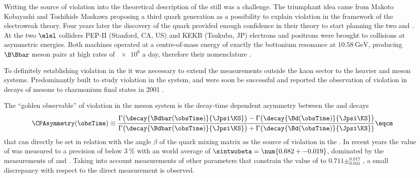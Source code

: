Writing the source of \CP violation into the theoretical description of the  \SM
still was a challenge. The triumphant idea came from Makoto Kobayashi and
Toshihide Maskawa \cite{Kobayashi:1973fv} proposing a third quark generation as
a possibility to explain \CP violation in the framework of the electroweak
theory. Four years later the discovery of the \bquark quark \cite{Herb:1977ek}
provided enough confidence in their theory to start planning the two \BFactories
\Babar and \Belle. At the two $\elel$ colliders PEP-II (Stanford, CA, US) and
KEKB (Tsukuba, JP) electrons and positrons were brought to collisions at
asymmetric energies. Both machines operated at a centre-of-mass energy of
exactly the \YFourS bottonium resonance at $\SI{10.58}{\GeV}$, producing
$\B\Bbar$ meson pairs at high rates of $\num{e6}$ a day, therefore their
nomenclature \cite{Bevan:2014iga}.

To definitely establishing \CP violation in the \SM it was necessary to extend
the measurements outside the kaon sector to the heavier \B and \D meson systems.
Predominantly built to study \CP violation in the \Bmeson system, \Babar and
\Belle were soon be successful and reported the observation of \CP violation in
decays of \Bd mesons to charmonium final states in 2001
\cite{Aubert:2001nu,Abe:2001xe}.

The \enquote{golden observable} \cite{Bevan:2014iga} of \CP violation in the \Bd
meson system is the decay-time dependent \CP asymmetry between the  \BdToJpsiKS
and \BdbarToJpsiKS decays
%
\begin{equation*}
    \CPAsymmetry(\obsTime) \equiv 
      \frac{\Gamma\bigl(\decay{\Bdbar(\obsTime)}{\Jpsi\KS}\bigr) - \Gamma\bigl(\decay{\Bd(\obsTime)}{\Jpsi\KS}\bigr)}
           {\Gamma\bigl(\decay{\Bdbar(\obsTime)}{\Jpsi\KS}\bigr) + \Gamma\bigl(\decay{\Bd(\obsTime)}{\Jpsi\KS}\bigr)} \eqcm
\end{equation*}
%
that can directly be set in relation with the angle $\beta$ of the \CKM quark
mixing matrix as the source of \CP violation in the \SM. In recent years the
value of \sintwobeta was measured to a precision of below $\SI{3}{\percent}$
with an world average of $\sintwobeta = \num{0.682 +- 0.019}$, dominated by the
measurements of \Babar and \Belle \cite{Amhis:2014hma}. Taking into account
measurements of other parameters that constrain the value of \sintwobeta to
$0.711\pm^{0.017}_{0.041}$ \cite{Charles:2015gya}, a small discrepancy with
respect to the direct measurement is observed.


